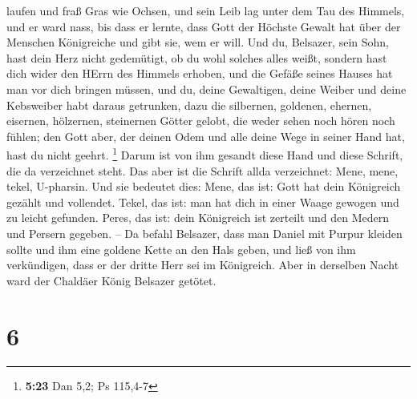 laufen und fraß Gras wie Ochsen, und sein Leib lag unter dem Tau des
Himmels, und er ward nass, bis dass er lernte, dass Gott der Höchste
Gewalt hat über der Menschen Königreiche und gibt sie, wem er will.
 Und du, Belsazer, sein Sohn, hast dein Herz nicht
gedemütigt, ob du wohl solches alles weißt,  sondern hast
dich wider den HErrn des Himmels erhoben, und die Gefäße seines Hauses
hat man vor dich bringen müssen, und du, deine Gewaltigen, deine Weiber
und deine Kebsweiber habt daraus getrunken, dazu die silbernen,
goldenen, ehernen, eisernen, hölzernen, steinernen Götter gelobt, die
weder sehen noch hören noch fühlen; den Gott aber, der deinen Odem und
alle deine Wege in seiner Hand hat, hast du nicht geehrt. \footnote{\textbf{5:23}
  Dan 5,2; Ps 115,4-7}  Darum ist von ihm gesandt diese
Hand und diese Schrift, die da verzeichnet steht.  Das
aber ist die Schrift allda verzeichnet: Mene, mene, tekel, U-pharsin.
 Und sie bedeutet dies: Mene, das ist: Gott hat dein
Königreich gezählt und vollendet.  Tekel, das ist: man
hat dich in einer Waage gewogen und zu leicht gefunden. 
Peres, das ist: dein Königreich ist zerteilt und den Medern und Persern
gegeben. --  Da befahl Belsazer, dass man Daniel mit
Purpur kleiden sollte und ihm eine goldene Kette an den Hals geben, und
ließ von ihm verkündigen, dass er der dritte Herr sei im Königreich.
 Aber in derselben Nacht ward der Chaldäer König Belsazer
getötet.

\hypertarget{section-5}{%
\section{6}\label{section-5}}

